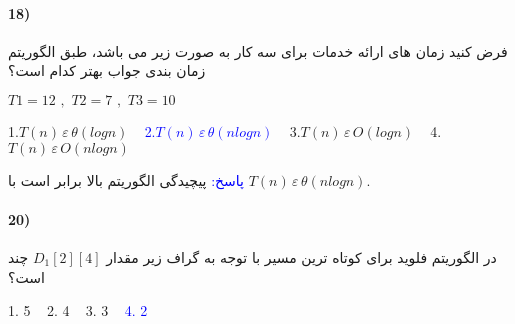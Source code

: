 \documentclass[10pt,a4paper]{article}
\begin{document}
	\paragraph{18)} فرض کنید زمان های ارائه خدمات برای سه کار به صورت زیر می باشد، طبق الگوریتم زمان بندی جواب بهتر کدام است؟
	\begin{flushleft}                           
		$T1 = 12\,\, , \,\, T2 = 7\,\, , \,\, T3 = 10$
	\end{flushleft}
	\begin{flushright} 
		1.$T(n)\,\varepsilon\,\theta(logn)$\,\,\,\,\, \textcolor{blue}{2.$T(n)\,\varepsilon\,\theta(nlogn)$}\,\,\,\,\, 3.$T(n)\,\varepsilon\,O(logn)$\,\,\,\,\, 4.$T(n)\,\varepsilon\,O(nlogn)$
	\end{flushright}
	\begin{flushright} 
		\textcolor{blue}{پاسخ:}
	پیچیدگی الگوریتم بالا برابر است با $T(n)\,\varepsilon\,\theta(nlogn)$.
	\end{flushright}

	\paragraph{20)} در الگوریتم فلوید برای کوتاه ترین مسیر با توجه به گراف زیر مقدار $D_1[2][4]$ چند است؟

	\begin{flushright} 
		1.\,\,5\,\,\,\,\, 2.\,\,4\,\,\,\,\, 3.\,\,3\,\,\,\,\, \textcolor{blue}{4.\,\,2}
	\end{flushright}
\end{document}
